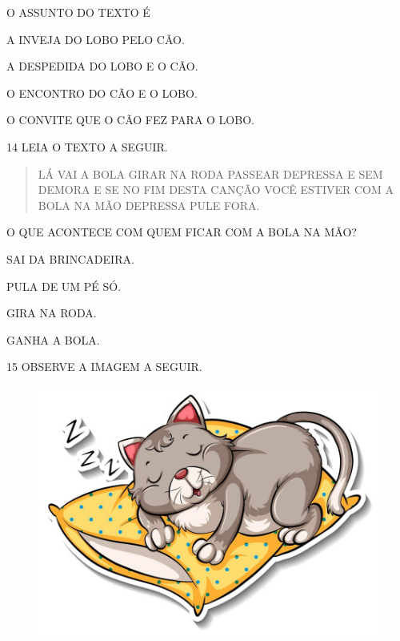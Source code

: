 O ASSUNTO DO TEXTO É

\begin{escolha}

\item A INVEJA DO LOBO PELO CÃO.

\item A DESPEDIDA DO LOBO E O CÃO.

\item O ENCONTRO DO CÃO E O LOBO.

\item O CONVITE QUE O CÃO FEZ PARA O LOBO.

\end{escolha}

\num{14} LEIA O TEXTO A SEGUIR.

\begin{myquote}
\begin{verse}
LÁ VAI A BOLA
GIRAR NA RODA
PASSEAR DEPRESSA
E SEM DEMORA
E SE NO FIM
DESTA CANÇÃO
VOCÊ ESTIVER
COM A BOLA NA MÃO
DEPRESSA PULE FORA.
\end{verse}

\end{myquote}

\pagebreak
O QUE ACONTECE COM QUEM FICAR COM A BOLA NA MÃO?

\begin{escolha}

\item SAI DA BRINCADEIRA.
\item PULA DE UM PÉ SÓ.
\item GIRA NA RODA.
\item GANHA A BOLA.

\end{escolha}

\num{15} OBSERVE A IMAGEM A SEGUIR.

\begin{figure}[H]
\centering
\includegraphics[width=.7\textwidth]{./media/image229.jpg}
\end{figure}

